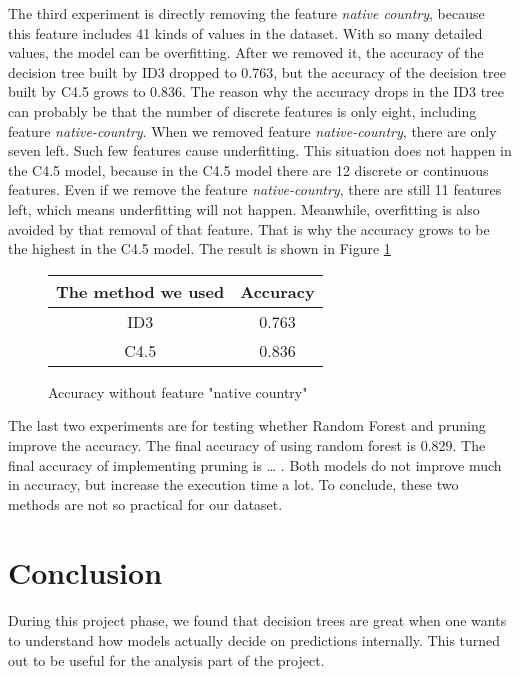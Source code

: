 \documentclass[a4paper]{article}
\begin{document}
The third experiment is directly removing the feature \emph{native country}, because this feature includes 41 kinds of values in the dataset. With so many detailed values, the model can be overfitting. After we removed it, the accuracy of the decision tree built by ID3 dropped to 0.763, but the accuracy of the decision tree built by C4.5 grows to 0.836. The reason why the accuracy drops in the ID3 tree can probably be that the number of discrete features is only eight, including feature \emph{native-country}. When we removed feature \emph{native-country}, there are only seven left. Such few features cause underfitting. This situation does not happen in the C4.5 model, because in the C4.5 model there are 12 discrete or continuous features. Even if we remove the feature \emph{native-country}, there are still 11 features left, which means underfitting will not happen. Meanwhile, overfitting is also avoided by that removal of that feature. That is why the accuracy grows to be the highest in the C4.5 model. The result is shown in Figure \ref{fig:withoutnc}

\begin{figure}[h]
	\centering
    \begin{tabular}{c|c}
    The method we used & Accuracy \\
        \hline
        ID3 & 0.763\\
        \hline
        C4.5 & 0.836\\
    \end{tabular}
    \caption{Accuracy without feature "native country"}
    \label{fig:withoutnc}
\end{figure}

The last two experiments are for testing whether Random Forest and pruning improve the accuracy. The final accuracy of using random forest is 0.829. The final accuracy of implementing pruning is \dots {} . Both models do not improve much in accuracy, but increase the execution time a lot. To conclude, these two methods are not so practical for our dataset.

\section{Conclusion}

During this project phase, we found that decision trees are great when one wants to understand how models actually decide on predictions internally. This turned out to be useful for the analysis part of the project.
\end{document}
